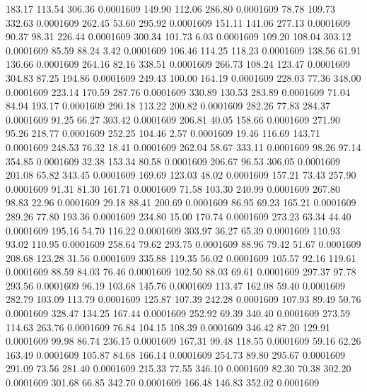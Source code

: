 183.17  113.54  306.36   0.0001609
 149.90  112.06  286.80   0.0001609
  78.78  109.73  332.63   0.0001609
 262.45   53.60  295.92   0.0001609
 151.11  141.06  277.13   0.0001609
  90.37   98.31  226.44   0.0001609
 300.34  101.73    6.03   0.0001609
 109.20  108.04  303.12   0.0001609
  85.59   88.24    3.42   0.0001609
 106.46  114.25  118.23   0.0001609
 138.56   61.91  136.66   0.0001609
 264.16   82.16  338.51   0.0001609
 266.73  108.24  123.47   0.0001609
 304.83   87.25  194.86   0.0001609
 249.43  100.00  164.19   0.0001609
 228.03   77.36  348.00   0.0001609
 223.14  170.59  287.76   0.0001609
 330.89  130.53  283.89   0.0001609
  71.04   84.94  193.17   0.0001609
 290.18  113.22  200.82   0.0001609
 282.26   77.83  284.37   0.0001609
  91.25   66.27  303.42   0.0001609
 206.81   40.05  158.66   0.0001609
 271.90   95.26  218.77   0.0001609
 252.25  104.46    2.57   0.0001609
  19.46  116.69  143.71   0.0001609
 248.53   76.32   18.41   0.0001609
 262.04   58.67  333.11   0.0001609
  98.26   97.14  354.85   0.0001609
  32.38  153.34   80.58   0.0001609
 206.67   96.53  306.05   0.0001609
 201.08   65.82  343.45   0.0001609
 169.69  123.03   48.02   0.0001609
 157.21   73.43  257.90   0.0001609
  91.31   81.30  161.71   0.0001609
  71.58  103.30  240.99   0.0001609
 267.80   98.83   22.96   0.0001609
  29.18   88.41  200.69   0.0001609
  86.95   69.23  165.21   0.0001609
 289.26   77.80  193.36   0.0001609
 234.80   15.00  170.74   0.0001609
 273.23   63.34   44.40   0.0001609
 195.16   54.70  116.22   0.0001609
 303.97   36.27   65.39   0.0001609
 110.93   93.02  110.95   0.0001609
 258.64   79.62  293.75   0.0001609
  88.96   79.42   51.67   0.0001609
 208.68  123.28   31.56   0.0001609
 335.88  119.35   56.02   0.0001609
 105.57   92.16  119.61   0.0001609
  88.59   84.03   76.46   0.0001609
 102.50   88.03   69.61   0.0001609
 297.37   97.78  293.56   0.0001609
  96.19  103.68  145.76   0.0001609
 113.47  162.08   59.40   0.0001609
 282.79  103.09  113.79   0.0001609
 125.87  107.39  242.28   0.0001609
 107.93   89.49   50.76   0.0001609
 328.47  134.25  167.44   0.0001609
 252.92   69.39  340.40   0.0001609
 273.59  114.63  263.76   0.0001609
  76.84  104.15  108.39   0.0001609
 346.42   87.20  129.91   0.0001609
  99.98   86.74  236.15   0.0001609
 167.31   99.48  118.55   0.0001609
  59.16   62.26  163.49   0.0001609
 105.87   84.68  166.14   0.0001609
 254.73   89.80  295.67   0.0001609
 291.09   73.56  281.40   0.0001609
 215.33   77.55  346.10   0.0001609
  82.30   70.38  302.20   0.0001609
 301.68   66.85  342.70   0.0001609
 166.48  146.83  352.02   0.0001609
